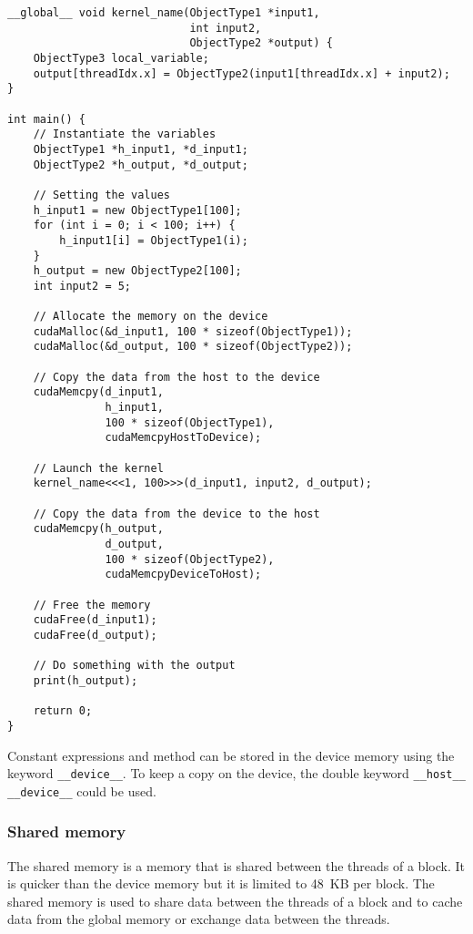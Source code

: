 \begin{code}
    \label{code:analyze:cuda:memory:device:copy-read}
    \begin{verbatim}
__global__ void kernel_name(ObjectType1 *input1,
                            int input2,
                            ObjectType2 *output) {
    ObjectType3 local_variable;
    output[threadIdx.x] = ObjectType2(input1[threadIdx.x] + input2);
}

int main() {
    // Instantiate the variables
    ObjectType1 *h_input1, *d_input1;
    ObjectType2 *h_output, *d_output;

    // Setting the values
    h_input1 = new ObjectType1[100];
    for (int i = 0; i < 100; i++) {
        h_input1[i] = ObjectType1(i);
    }
    h_output = new ObjectType2[100];
    int input2 = 5;

    // Allocate the memory on the device
    cudaMalloc(&d_input1, 100 * sizeof(ObjectType1));
    cudaMalloc(&d_output, 100 * sizeof(ObjectType2));

    // Copy the data from the host to the device
    cudaMemcpy(d_input1,
               h_input1,
               100 * sizeof(ObjectType1),
               cudaMemcpyHostToDevice);

    // Launch the kernel
    kernel_name<<<1, 100>>>(d_input1, input2, d_output);

    // Copy the data from the device to the host
    cudaMemcpy(h_output,
               d_output,
               100 * sizeof(ObjectType2),
               cudaMemcpyDeviceToHost);

    // Free the memory
    cudaFree(d_input1);
    cudaFree(d_output);

    // Do something with the output
    print(h_output);

    return 0;
}
    \end{verbatim}
\end{code}

Constant expressions and method can be stored in the device memory using the
keyword \texttt{\_\_device\_\_}.
To keep a copy on the device, the double keyword
\texttt{\_\_host\_\_ \_\_device\_\_} could be used.


\subsubsection{Shared memory}
\label{ch:analyze:cuda:memory:shared}

The shared memory is a memory that is shared between the threads of a block.
It is quicker than the device memory but it is limited to 48~KB per block.
The shared memory is used to share data between the threads of a block and to
cache data from the global memory or exchange data between the threads.

